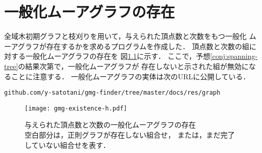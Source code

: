 
\chapter{一般化ムーアグラフの存在}
\label{chap:list-of-gmg}
全域木初期グラフと枝刈りを用いて，与えられた頂点数と次数をもつ一般化
ムーアグラフが存在するかを求めるプログラムを作成した．
頂点数と次数の組に対する一般化ムーアグラフの存在を
図\ref{fig:gmg-existence}に示す．
ここで，予想\ref{conj:spanning-tree}の結果次第で，一般化ムーアグラフが
存在しないと示された組が無効になることに注意する．
一般化ムーアグラフの実体は次のURLに公開している．
\begin{verbatim}
github.com/y-satotani/gmg-finder/tree/master/docs/res/graph
\end{verbatim}

\begin{figure}[htbp]
  \centering
  \captionsetup{justification=centering}
  \texttt{[image: gmg-existence-h.pdf]}
  \caption{与えられた頂点数と次数の一般化ムーアグラフの存在\\
    空白部分は，正則グラフが存在しない組合せ，
    または，まだ完了していない組合せを表す．}
  \label{fig:gmg-existence}
\end{figure}
